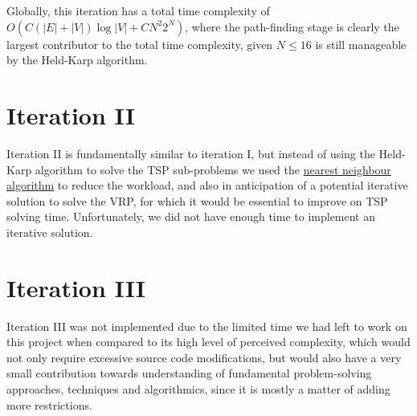 Globally, this iteration has a total time complexity of $O(C(|E|+|V|) \log |V| + C N^2 2^N)$, where the path-finding stage is clearly the largest contributor to the total time complexity, given $N \leq 16$ is still manageable by the Held-Karp algorithm.
\section{Iteration II} \label{iterations-2}
Iteration II is fundamentally similar to iteration I, but instead of using the Held-Karp algorithm to solve the \acrshort{TSP} sub-problems we used the \hyperref[algorithm-tsp-nn]{nearest neighbour algorithm} to reduce the workload, and also in anticipation of a potential iterative solution to solve the \acrshort{VRP}, for which it would be essential to improve on \acrshort{TSP} solving time. Unfortunately, we did not have enough time to implement an iterative solution.

\section{Iteration III} \label{iterations-3}
Iteration III was not implemented due to the limited time we had left to work on this project when compared to its high level of perceived complexity, which would not only require excessive source code modifications, but would also have a very small contribution towards understanding of fundamental problem-solving approaches, techniques and algorithmics, since it is mostly a matter of adding more restrictions.
